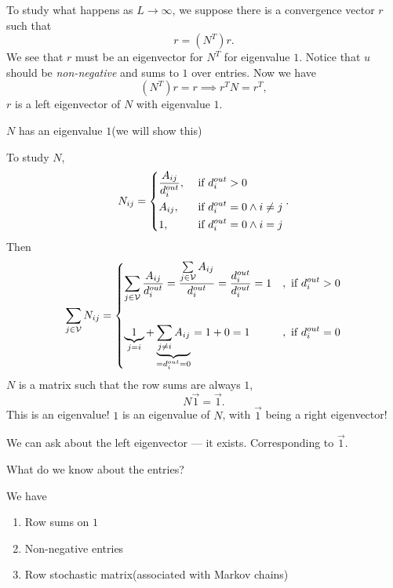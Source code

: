 To study what happens as \(L\to \infty\), we suppose there is a convergence vector \(r\) such that
\[
	r = (N^{T})r.
\]
We see that \(r\) must be an eigenvector for \(N^{T}\) for eigenvalue \(1\). Notice that \(u\) should be
\emph{non-negative} and sums to \(1\) over entries. Now we have
\[
	(N^{T})r = r \implies r^{T}N = r^{T},
\]
\(r\) is a left eigenvector of \(N\) with eigenvalue \(1\).
\begin{note}
	\(N\) has an eigenvalue \(1\)(we will show this)
\end{note}
To study \(N\),
\[
	N_{ij} = \begin{dcases}
		\frac{A_{ij}}{d_{i}^{out}}, & \text{ if }d_{i}^{out}>0               \\
		A_{ij},                     & \text{ if }d_{i}^{out}=0\land i\neq  j \\
		1,                          & \text{ if }d_{i}^{out}=0 \land i = j   \\
	\end{dcases}.
\]
Then
\[
	\sum\limits_{j\in\mathcal{V}}N_{ij} = \begin{dcases}
		\sum\limits_{j\in\mathcal{V}} \frac{A_{ij}}{d_{i}^{out}} = \frac{\sum\limits_{j\in\mathcal{V}} A_{ij} }{d_{i}^{out}} = \frac{d_{i}^{out}}{d_{i}^{out}}= 1 & , \text{ if }d_{i}^{out} > 0 \\\\
		\underbrace{1}_{j = i} + \underbrace{\sum\limits_{j\neq i} A_{ij}}_{ = d_{i}^{out} = 0} = 1 + 0 = 1                                                       & , \text{ if }d_{i}^{out} = 0 \\
	\end{dcases}
\]
\(N\) is a matrix such that the row sums are always \(1\),
\[
	N \vec{1} = \vec{1}.
\]
This is an eigenvalue! \(1\) is an eigenvalue of \(N\), with \(\vec{1}\) being a right eigenvector!

We can ask about the left eigenvector — it exists. Corresponding to \(\vec{1}\).
\begin{problem}
What do we know about the entries?
\end{problem}
\begin{answer}
	We have
	\begin{enumerate}
		\item Row sums on \(1\)
		\item Non-negative entries
		\item Row stochastic matrix(associated with Markov chains)
	\end{enumerate}
\end{answer}

